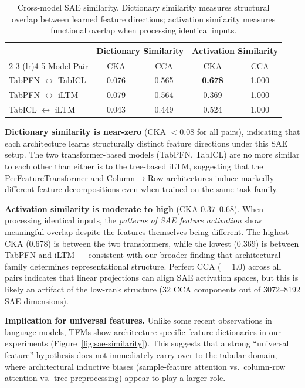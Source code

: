 \documentclass{article}
\begin{document}
\begin{table}[htbp]
\centering
\caption{Cross-model SAE similarity. Dictionary similarity measures structural overlap between learned feature directions; activation similarity measures functional overlap when processing identical inputs.}
\label{tab:sae-similarity}
\small
\begin{tabular}{@{}l cc cc@{}}
\toprule
& \multicolumn{2}{c}{Dictionary Similarity} & \multicolumn{2}{c}{Activation Similarity} \\
\cmidrule(lr){2-3} \cmidrule(lr){4-5}
Model Pair & CKA & CCA & CKA & CCA \\
\midrule
TabPFN $\leftrightarrow$ TabICL & 0.076 & 0.565 & \textbf{0.678} & 1.000 \\
TabPFN $\leftrightarrow$ iLTM & 0.079 & 0.564 & 0.369 & 1.000 \\
TabICL $\leftrightarrow$ iLTM & 0.043 & 0.449 & 0.524 & 1.000 \\
\bottomrule
\end{tabular}
\end{table}

\textbf{Dictionary similarity is near-zero} (CKA $< 0.08$ for all pairs), indicating that each architecture learns structurally distinct feature directions under this SAE setup. The two transformer-based models (TabPFN, TabICL) are no more similar to each other than either is to the tree-based iLTM, suggesting that the PerFeatureTransformer and Column$\to$Row architectures induce markedly different feature decompositions even when trained on the same task family.

\textbf{Activation similarity is moderate to high} (CKA $0.37$--$0.68$). When processing identical inputs, the \textit{patterns of SAE feature activation} show meaningful overlap despite the features themselves being different. The highest CKA (0.678) is between the two transformers, while the lowest (0.369) is between TabPFN and iLTM --- consistent with our broader finding that architectural family determines representational structure. Perfect CCA ($= 1.0$) across all pairs indicates that linear projections can align SAE activation spaces, but this is likely an artifact of the low-rank structure (32 CCA components out of 3072--8192 SAE dimensions).

\textbf{Implication for universal features.} Unlike some recent observations in language models, TFMs show architecture-specific feature dictionaries in our experiments (Figure~\ref{fig:sae-similarity}). This suggests that a strong ``universal feature'' hypothesis does not immediately carry over to the tabular domain, where architectural inductive biases (sample-feature attention vs.\ column-row attention vs.\ tree preprocessing) appear to play a larger role.
\end{document}
